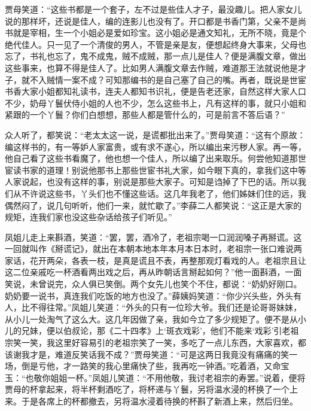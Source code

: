 贾母笑道：“这些书都是一个套子，左不过是些佳人才子，最没趣儿。把人家女儿说的那样坏，还说是佳人，编的连影儿也没有了。开口都是书香门第，父亲不是尚书就是宰相，生一个小姐必是爱如珍宝。这小姐必是通文知礼，无所不晓，竟是个绝代佳人。只一见了一个清俊的男人，不管是亲是友，便想起终身大事来，父母也忘了，书礼也忘了，鬼不成鬼，贼不成贼，那一点儿是佳人？便是满腹文章，做出这些事来，也算不得是佳人了。比如男人满腹文章去作贼，难道那王法就说他是才子，就不入贼情一案不成？可知那编书的是自己塞了自己的嘴。再者，既说是世宦书香大家小姐都知礼读书，连夫人都知书识礼，便是告老还家，自然这样大家人口不少，奶母丫鬟伏侍小姐的人也不少，怎么这些书上，凡有这样的事，就只小姐和紧跟的一个丫鬟？你们白想想，那些人都是管什么的，可是前言不答后语？”

众人听了，都笑说：“老太太这一说，是谎都批出来了。”贾母笑道：“这有个原故：编这样书的，有一等妒人家富贵，或有求不遂心，所以编出来污秽人家。再一等，他自己看了这些书看魔了，他也想一个佳人，所以编了出来取乐。何尝他知道那世宦读书家的道理！别说他那书上那些世宦书礼大家，如今眼下真的，拿我们这中等人家说起，也没有这样的事，别说是那些大家子。可知是诌掉了下巴的话。所以我们从不许说这些书，丫头们也不懂这些话。这几年我老了，他们姊妹们住的远，我偶然闷了，说几句听听，他们一来，就忙歇了。”李薛二人都笑说：“这正是大家的规矩，连我们家也没这些杂话给孩子们听见。”

凤姐儿走上来斟酒，笑道：“罢，罢，酒冷了，老祖宗喝一口润润嗓子再掰谎。这一回就叫作《掰谎记》，就出在本朝本地本年本月本日本时，老祖宗一张口难说两家话，花开两朵，各表一枝，是真是谎且不表，再整那观灯看戏的人。老祖宗且让这二位亲戚吃一杯酒看两出戏之后，再从昨朝话言掰起如何？”他一面斟酒，一面笑说，未曾说完，众人俱已笑倒。两个女先儿也笑个不住，都说：“奶奶好刚口。奶奶要一说书，真连我们吃饭的地方也没了。”薛姨妈笑道：“你少兴头些，外头有人，比不得往常。”凤姐儿笑道：“外头的只有一位珍大爷。我们还是论哥哥妹妹，从小儿一处淘气了这么大。这几年因做了亲，我如今立了多少规矩了。便不是从小儿的兄妹，便以伯叔论，那《二十四孝》上‘斑衣戏彩’，他们不能来‘戏彩’引老祖宗笑一笑，我这里好容易引的老祖宗笑了一笑，多吃了一点儿东西，大家喜欢，都该谢我才是，难道反笑话我不成？”贾母笑道：“可是这两日我竟没有痛痛的笑一场，倒是亏他，才一路笑的我心里痛快了些，我再吃一钟酒。”吃着酒，又命宝玉：“也敬你姐姐一杯。”凤姐儿笑道：“不用他敬，我讨老祖宗的寿罢。”说着，便将贾母的杯拿起来，将半杯剩酒吃了，将杯递与丫鬟，另将温水浸的杯换了一个上来。于是各席上的杯都撤去，另将温水浸着待换的杯斟了新酒上来，然后归坐。

